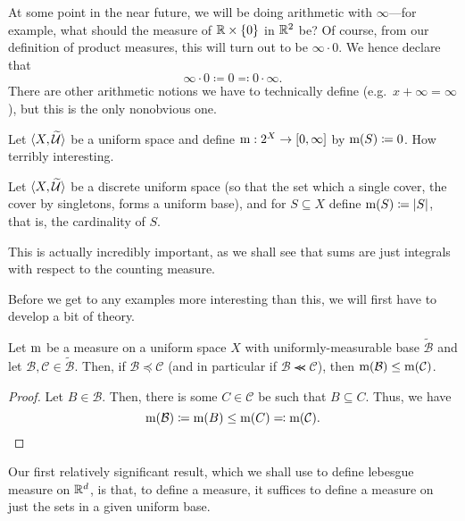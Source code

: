 \begin{displayquote}
At some point in the near future, we will be doing arithmetic with $\infty$---for example, what should the measure of $\mathbb{R} \times \{ 0\}$ in $\mathbb{R} ^2$ be?  Of course, from our definition of product measures, this will turn out to be $\infty \cdot 0$.  We hence declare that
\begin{equation}
\infty \cdot 0\coloneqq 0\eqqcolon 0\cdot \infty .
\end{equation}
There are other arithmetic notions we have to technically define (e.g.~$x+\infty=\infty$), but this is the only nonobvious one.
\end{displayquote}
\begin{exm}
Let $\langle X,\widetilde{\mathcal{U}}\rangle$ be a uniform space and define $\mathrm{m} :2^X\rightarrow [0,\infty ]$ by $\mathrm{m} (S)\coloneqq 0$.  How terribly interesting.
\end{exm}
\begin{exm}
Let $\langle X,\widetilde{\mathcal{U}}\rangle$ be a discrete uniform space (so that the set which a single cover, the cover by singletons, forms a uniform base), and for $S\subseteq X$ define $\mathrm{m} (S)\coloneqq \lvert S\rvert$, that is, the cardinality of $S$.
\begin{rmk}
This is actually incredibly important, as we shall see that sums are just integrals with respect to the counting measure.
\end{rmk}
\end{exm}
Before we get to any examples more interesting than this, we will first have to develop a bit of theory.
\begin{prp}
Let $\mathrm{m}$ be a measure on a uniform space $X$ with uniformly-measurable base $\widetilde{\mathcal{B}}$ and let $\mathcal{B},\mathcal{C}\in \widetilde{\mathcal{B}}$.  Then, if $\mathcal{B}\preceq \mathcal{C}$ (and in particular if $\mathcal{B}\llcurly \mathcal{C}$), then $\mathrm{m} (\mathcal{B})\leq \mathrm{m} (\mathcal{C})$.
\begin{proof}
Let $B\in \mathcal{B}$.  Then, there is some $C\in \mathcal{C}$ be such that $B\subseteq C$.  Thus, we have
\begin{equation}
\mathrm{m} (\mathcal{B})\coloneqq \mathrm{m} (B)\leq \mathrm{m} (C)\eqqcolon \mathrm{m} (\mathcal{C}).
\end{equation}
\end{proof}
\end{prp}
Our first relatively significant result, which we shall use to define lebesgue measure on $\mathbb{R} ^d$, is that, to define a measure, it suffices to define a measure on just the sets in a given uniform base.
